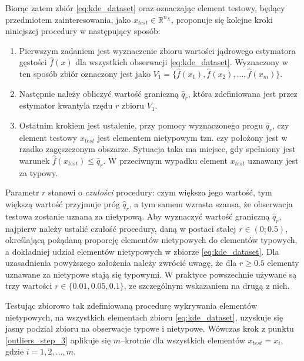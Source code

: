\documentclass[12pt,a4paper,oneside]{book}
\theoremstyle{definition}
\begin{document}
Biorąc zatem zbiór \eqref{eq:kde_dataset} oraz oznaczając element testowy, będący przedmiotem zainteresowania, jako $x_{test} \in \mathbb{R}^{n_X}$, proponuje się kolejne kroki niniejszej procedury w następujący sposób:
\begin{enumerate}
\item Pierwszym zadaniem jest wyznaczenie zbioru wartości jądrowego estymatora gęstości $\hat{f}(x)$ dla wszystkich obserwacji \eqref{eq:kde_dataset}. Wyznaczony w ten sposób zbiór oznaczony jest jako $V_1=\{\hat{f}(x_1),\hat{f}(x_2), ..., \hat{f}(x_m)\}$.
\item Następnie należy obliczyć wartość graniczną $\hat{q}_r$, która zdefiniowana jest przez estymator kwantyla \cite{Hyndman_1996, Walker_1958} rzędu $r$ zbioru $V_1$.
\item \label{outliers_step_3} Ostatnim krokiem jest ustalenie, przy pomocy wyznaczonego progu $\hat{q}_r$, czy element testowy $x_{test}$ jest elementem nietypowym tzn. czy położony jest w rzadko zagęszczonym obszarze. Sytuacja taka ma miejsce, gdy spełniony jest warunek $\hat{f}(x_{test}) \leq \hat{q}_r$. W przeciwnym wypadku element $x_{test}$ uznawany jest za typowy.
\end{enumerate}
Parametr $r$ stanowi o \textit{czułości} procedury: czym większa jego wartość, tym większą wartość przyjmuje próg $\hat{q}_r$, a tym samem wzrasta szansa, że obserwacja testowa zostanie uznana za nietypową. Aby wyznaczyć wartość graniczną $\hat{q}_r$, najpierw należy ustalić czułość procedury, daną w postaci stałej $r \in (0; 0.5)$, określającą pożądaną proporcję elementów nietypowych do elementów typowych, a dokładniej udział elementów nietypowych w zbiorze \eqref{eq:kde_dataset}. Dla uzasadnienia powyższego założenia należy zwrócić uwagę, że dla $r \geq 0.5$ elementy uznawane za nietypowe stają  się typowymi. W praktyce powszechnie używane są trzy wartości $r \in \{0.01,0.05,0.1\}$, ze szczególnym wskazaniem na drugą z nich.

Testując zbiorowo tak zdefiniowaną procedurę wykrywania elementów nietypowych, na wszystkich elementach zbioru \eqref{eq:kde_dataset}, uzyskuje się jasny podział zbioru na obserwacje typowe i nietypowe. Wówczas krok z punktu \ref{outliers_step_3} aplikuje się $m$--krotnie dla wszystkich elementów $x_{test}=x_i$, gdzie $i=1,2,...,m$.
\end{document}
